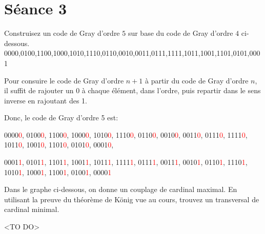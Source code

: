 
\section{Séance 3}

\vspace*{1cm}

\begin{exo}
Construisez un code de Gray d'ordre $5$ sur base du code de Gray d'ordre $4$ ci-dessous.\\
0000,0100,1100,1000,1010,1110,0110,0010,0011,0111,1111,1011,1001,1101,0101,0001
\end{exo}

Pour consuire le code de Gray d'ordre $n+1$ à partir du code de Gray d'ordre $n$, il suffit de rajouter un 0 à chaque élément, dans l'ordre, puis repartir dans le sens inverse en rajoutant des 1.

Donc, le code de Gray d'ordre 5 est: 

0000\textcolor{red}{0}, 0100\textcolor{red}{0}, 1100\textcolor{red}{0}, 1000\textcolor{red}{0}, 1010\textcolor{red}{0}, 1110\textcolor{red}{0}, 0110\textcolor{red}{0}, 0010\textcolor{red}{0}, 0011\textcolor{red}{0}, 0111\textcolor{red}{0}, 1111\textcolor{red}{0}, 1011\textcolor{red}{0}, 1001\textcolor{red}{0}, 1101\textcolor{red}{0}, 0101\textcolor{red}{0}, 0001\textcolor{red}{0}, 

0001\textcolor{red}{1}, 0101\textcolor{red}{1}, 1101\textcolor{red}{1}, 1001\textcolor{red}{1}, 1011\textcolor{red}{1}, 1111\textcolor{red}{1}, 0111\textcolor{red}{1}, 0011\textcolor{red}{1}, 0010\textcolor{red}{1}, 0110\textcolor{red}{1}, 1110\textcolor{red}{1}, 1010\textcolor{red}{1}, 1000\textcolor{red}{1}, 1100\textcolor{red}{1}, 0100\textcolor{red}{1}, 0000\textcolor{red}{1}

\begin{exo}
Dans le graphe ci-dessous, on donne un couplage de cardinal maximal. En utilisant la preuve du th\'eor\`eme de K\"onig vue au cours, trouvez un transversal de cardinal minimal.
\end{exo}

\begin{figure}[!h]
\begin{center}

\end{center}
\caption{}
\end{figure}

<TO DO>


